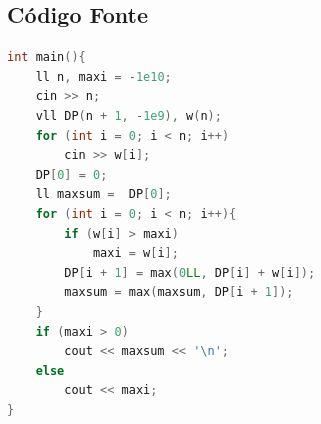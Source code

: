 \documentclass[12pt,a4paper]{article}
\begin{document}
\subsection{Código Fonte}
\begin{lstlisting}[language=C++]
int main(){
    ll n, maxi = -1e10;
    cin >> n;
    vll DP(n + 1, -1e9), w(n);
    for (int i = 0; i < n; i++)
        cin >> w[i];
    DP[0] = 0;
    ll maxsum =  DP[0];
    for (int i = 0; i < n; i++){
        if (w[i] > maxi)
            maxi = w[i];
        DP[i + 1] = max(0LL, DP[i] + w[i]);
        maxsum = max(maxsum, DP[i + 1]);
    }
    if (maxi > 0)
        cout << maxsum << '\n';
    else 
        cout << maxi;
}
\end{lstlisting}
\end{document}
